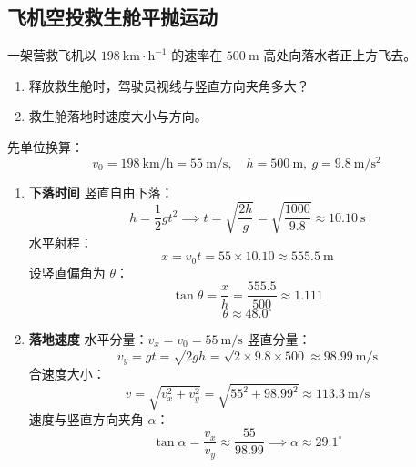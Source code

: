 \subsection{飞机空投救生舱平抛运动}
\begin{center}
\end{center}
一架营救飞机以 $198\ \mathrm{km\cdot h^{-1}}$ 的速率在 $500\ \mathrm{m}$ 高处向落水者正上方飞去。
\begin{enumerate}
    \item 释放救生舱时，驾驶员视线与竖直方向夹角多大？
    \item 救生舱落地时速度大小与方向。
\end{enumerate}
\begin{solution}
先单位换算：
\[
v_0 = 198\ \mathrm{km/h} = 55\ \mathrm{m/s},\quad h=500\ \mathrm{m},\ g=9.8\ \mathrm{m/s^2}
\]
\begin{enumerate}
    \item \textbf{下落时间}
竖直自由下落：
\[
h = \frac12 g t^2 \implies t=\sqrt{\frac{2h}{g}}
=\sqrt{\frac{1000}{9.8}}\approx 10.10\ \mathrm{s}
\]
水平射程：
\[
x = v_0 t = 55 \times 10.10 \approx 555.5\ \mathrm{m}
\]
设竖直偏角为 $\theta$：
\[
\tan\theta = \frac{x}{h} = \frac{555.5}{500}\approx 1.111
\]
\[
\boxed{\theta \approx 48.0^\circ}
\]
    \item \textbf{落地速度}
水平分量：$v_x=v_0=55\ \mathrm{m/s}$
竖直分量：
\[
v_y = gt = \sqrt{2gh} = \sqrt{2\times9.8\times500}\approx98.99\ \mathrm{m/s}
\]
合速度大小：
\[
v=\sqrt{v_x^2+v_y^2}
=\sqrt{55^2+98.99^2}\approx \boxed{113.3\ \mathrm{m/s}}
\]
速度与竖直方向夹角 $\alpha$：
\[
\tan\alpha = \frac{v_x}{v_y} \approx \frac{55}{98.99} \implies \alpha\approx 29.1^\circ
\]
\end{enumerate}
\end{solution}

